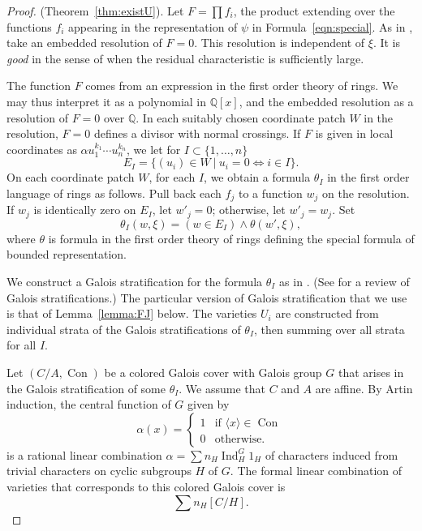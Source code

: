 \documentclass[11pt]{amsart}
\theoremstyle{definition}
\theoremstyle{remark}
\numberwithin{equation}{theorem}
\def\tq{{\ \vert\ }}
\newcommand{\ring}[1]{\mathbb{#1}}
\def\op#1{\operatorname{#1}}
\begin{document}
\begin{proof} (Theorem~\ref{thm:existU}).
Let $F = \prod f_i$, the product extending over the functions
$f_i$ appearing in the representation of $\psi$ in
Formula~\ref{eqn:special}.   As in
\cite[Proof~7.1.1,Proof~8.3.1]{DLD}, take an embedded resolution
of $F=0$.  This resolution is independent of $\xi$.  It is {\it
good\/} in the sense of \cite{D-degree} when the residual
characteristic is sufficiently large.

The function $F$ comes from an expression in the first order
theory of rings.  We may thus interpret it as a polynomial in
$\ring{Q}[x]$, and the embedded resolution as a resolution of
$F=0$ over $\ring{Q}$.  In each suitably chosen coordinate patch
$W$ in the resolution, $F=0$ defines a divisor with normal
crossings. If $F$ is given in local coordinates as $\alpha
u_1^{k_1}\cdots u_n^{k_n}$, we let for $I \subset \{1,\ldots,n\}$
   \begin{equation}
   E_I = \{(u_i)\in W \tq  u_i = 0 \Leftrightarrow i\in I\}.
   \end{equation}
On each coordinate patch $W$, for each $I$, we obtain a formula
$\theta_I$ in the first order language of rings as follows.  Pull
back each $f_j$ to a function $w_j$ on the resolution.  If $w_j$
is identically zero on $E_I$, let $w'_j = 0$; otherwise, let $w'_j
= w_j$. Set
   \begin{equation}\theta_I(w,\xi) = (w \in E_I) \wedge \theta(w',\xi),
   \end{equation}
where $\theta$ is formula in the first order theory of rings
defining the special formula of bounded representation.

\smallskip
We construct a Galois stratification for the formula $\theta_I$ as
in \cite{DLD}.  (See \cite{FJ} for a review of Galois
stratifications.)  The particular version of Galois stratification
that we use is that of Lemma~\ref{lemma:FJ} below. The varieties
$U_i$ are constructed from individual strata of the Galois
stratifications of $\theta_I$, then summing over all strata for
all $I$.

Let $(C/A,\op{Con})$ be a colored Galois cover with Galois group
$G$ that arises in the Galois stratification of some $\theta_I$.
We assume that $C$ and $A$ are affine. By Artin induction, the
central function of $G$ given by
   \begin{equation}\alpha(x) = \begin{cases} 1 & \text{if } \langle x
\rangle
   \in \op{Con}\\
         0 & \text{otherwise.}
         \end{cases}
   \end{equation}
is a rational linear combination $\alpha = \sum n_H \op{Ind}_H^G
1_H$ of characters induced from trivial characters on cyclic
subgroups $H$ of $G$.  The formal linear combination of varieties
that corresponds to this colored Galois cover is
   \begin{equation}\sum n_H [C/H].\end{equation}


\end{proof}
\end{document}
